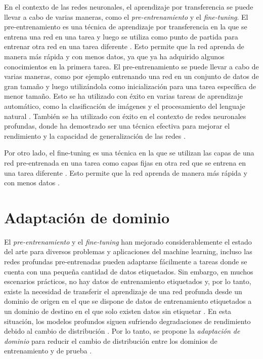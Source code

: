 En el contexto de las redes neuronales, el aprendizaje por transferencia se puede llevar a cabo de varias maneras, como
el {\it pre-entrenamiento} y el {\it fine-tuning}. El pre-entrenamiento es una técnica de aprendizaje por transferencia
en la que se entrena una red en una tarea y luego se utiliza como punto de partida para entrenar otra red en una tarea
diferente \parencite{erhan2010does}. Esto permite que la red aprenda de manera más rápida y con menos datos, ya que ya ha adquirido
algunos conocimientos en la primera tarea. El pre-entrenamiento se puede llevar a cabo de varias maneras, como por
ejemplo entrenando una red en un conjunto de datos de gran tamaño y luego utilizándola como inicialización para una
tarea específica de menor tamaño. Esto se ha utilizado con éxito en varias tareas de aprendizaje automático, como la
clasificación de imágenes \parencite{chen2021pretrained} y el procesamiento del lenguaje natural \parencite{liu2019text}. También se ha utilizado con éxito en el contexto de redes neuronales profundas, donde ha
demostrado ser una técnica efectiva para mejorar el rendimiento y la capacidad de generalización de las redes \parencite{girshick2014rich}.

Por otro lado, el fine-tuning es una técnica en la que se utilizan las capas de una red pre-entrenada en una tarea como
capas fijas en otra red que se entrena en una tarea diferente \parencite{yosinski2014transferable}. Esto permite que la red aprenda de manera más rápida y con menos datos \parencite{howard2018universal}.

\section{Adaptación de dominio}
El {\it pre-entrenamiento} y el {\it fine-tuning} han mejorado considerablemente el estado del arte para diversos
problemas y aplicaciones del machine learning, incluso las redes profundas pre-entrenadas pueden adaptarse fácilmente a
tareas donde se cuenta con una pequeña cantidad de datos etiquetados. Sin embargo, en muchos escenarios prácticos, no
hay datos de entrenamiento etiquetados y, por lo tanto, existe la necesidad de transferir el aprendizaje de una red
profunda desde un dominio de origen en el que se dispone de datos de entrenamiento etiquetados a un dominio de destino
en el que solo existen datos sin etiquetar \parencite{glorot2011domain}. En esta situación, los modelos profundos siguen sufriendo degradaciones de rendimiento debido
al cambio de distribución \parencite{quinonero2008dataset}. Por lo tanto, se propone la {\it adaptación de dominio} para reducir el cambio de
distribución entre los dominios de entrenamiento y de prueba \parencite{jiang2022machine}.

